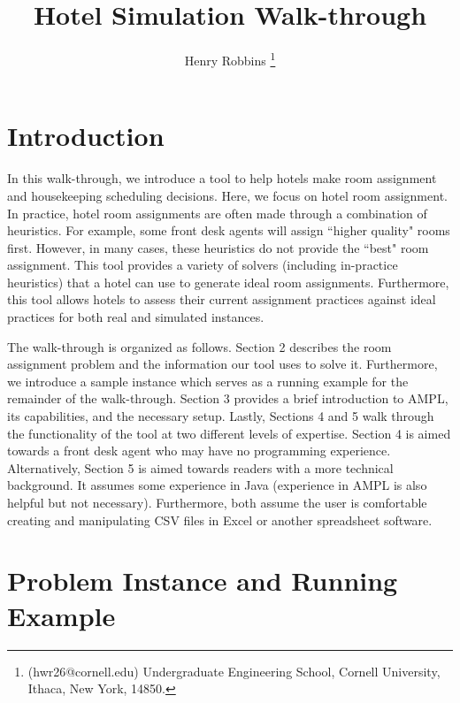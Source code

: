 \documentclass[11 pt]{article}
\title{Hotel Simulation Walk-through}
\author{Henry Robbins
\thanks{(hwr26@cornell.edu) Undergraduate Engineering School, Cornell University, Ithaca, New York, 14850.}}
\date{}
\begin{document}
\maketitle

\section{Introduction}

\par In this walk-through, we introduce a tool to help hotels make room assignment and housekeeping scheduling decisions. Here, we focus on hotel room assignment. In practice, hotel room assignments are often made through a combination of heuristics. For example, some front desk agents will assign ``higher quality" rooms first. However, in many cases, these heuristics do not provide the ``best" room assignment. This tool provides a variety of solvers (including in-practice heuristics) that a hotel can use to generate ideal room assignments. Furthermore, this tool allows hotels to assess their current assignment practices against ideal practices for both real and simulated instances.
\par The walk-through is organized as follows. Section 2 describes the room assignment problem and the information our tool uses to solve it. Furthermore, we introduce a sample instance which serves as a running example for the remainder of the walk-through. Section 3 provides a brief introduction to AMPL, its capabilities, and the necessary setup. Lastly, Sections 4 and 5 walk through the functionality of the tool at two different levels of expertise. Section 4 is aimed towards a front desk agent who may have no programming experience. Alternatively, Section 5 is aimed towards readers with a more technical background. It assumes some experience in Java (experience in AMPL is also helpful but not necessary). Furthermore, both assume the user is comfortable creating and manipulating CSV files in Excel or another spreadsheet software. 

\section{Problem Instance and Running Example}
\end{document}

